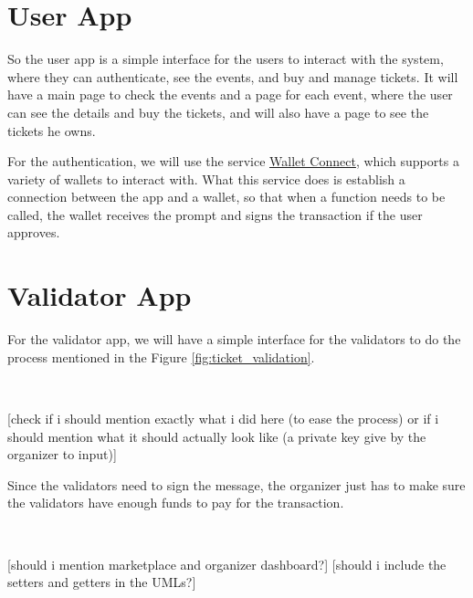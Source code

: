 \section{User App}
\label{sec:user_app}

So the user app is a simple interface for the users to interact with the system, where they can authenticate, see the events, and buy and manage tickets. It will have a main page to check the events and a page for each event, where the user can see the details and buy the tickets, and will also have a page to see the tickets he owns.

For the authentication, we will use the service \href{https://walletconnect.com/}{Wallet Connect}, which supports a variety of wallets to interact with. What this service does is establish a connection between the app and a wallet, so that when a function needs to be called, the wallet receives the prompt and signs the transaction if the user approves.

\section{Validator App}
\label{sec:validator_app}

For the validator app, we will have a simple interface for the validators to do the process mentioned in the Figure \ref{fig:ticket_validation}.

~

[check if i should mention exactly what i did here (to ease the process) or if i should mention what it should actually look like (a private key give by the organizer to input)]

Since the validators need to sign the message, the organizer just has to make sure the validators have enough funds to pay for the transaction.

~

[should i mention marketplace and organizer dashboard?]
[should i include the setters and getters in the UMLs?]
